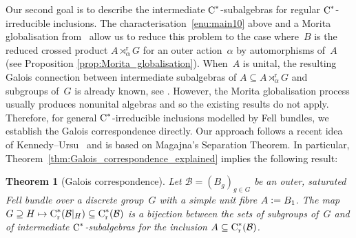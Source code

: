\documentclass[a4paper]{amsart}
\theoremstyle{plain}
\newtheorem{thmx}{Theorem}
\theoremstyle{definition}
\theoremstyle{remark}
\numberwithin{theorem}{section}
\numberwithin{equation}{section}
\newcommand*{\nb}{\nobreakdash}
\newcommand*{\red}{\mathrm{r}}%
\newcommand*{\Cst}{\textup C^*}%
\newcommand*{\B}{\mathcal B}%
\newcommand*{\defeq}{\mathrel{\vcentcolon=}}%
\begin{document}
Our second goal is to describe the intermediate
\(\Cst\)\nb-subalgebras for regular \(\Cst\)\nb-irreducible
inclusions.
The characterisation~\ref{enu:main10} above and a Morita globalisation
from~\cite{Kwasniewski-Meyer:Aperiodicity} allow us to reduce this
problem to the case where~\(B\) is the reduced crossed product
\(A\rtimes^\red_\alpha G\) for an outer action~\(\alpha\) by
automorphisms of~\(A\) (see Proposition
\ref{prop:Morita_globalisation}).
When~\(A\) is unital, the resulting Galois connection between
intermediate subalgebras of \(A\subseteq A\rtimes^\red_\alpha G\) and
subgroups of~\(G\) is already known, see
\cites{Cameron-Smith:Galois_reduced,
  Kennedy-Ursu:Intermediate_subalgebras_crossed,
  Rordam:Irreducible_inclusions}.
However, the Morita globalisation process usually produces nonunital
algebras and so the existing results do not apply.
Therefore, for general \(\Cst\)\nb-irreducible inclusions modelled by
Fell bundles, we establish the Galois correspondence directly.
Our approach follows a recent idea of
Kennedy--Ursu~\cite{Kennedy-Ursu:Intermediate_subalgebras_crossed} and
is based on Magajna's Separation Theorem.
In particular, Theorem~\ref{thm:Galois_correspondence_explained}
implies the following result:

\begin{thmx}[Galois correspondence]
  \label{Thm:Galois_correspondence}
  Let \(\B=(B_g)_{g\in G}\) be an outer, saturated Fell bundle over a
  discrete group~\(G\) with a simple unit fibre \(A\defeq B_1\).
  The map
  \(G\supseteq H \mapsto \Cst_\red(\B|_{H})\subseteq \Cst_\red(\B)\)
  is a bijection between the sets of subgroups of~\(G\)
  and of intermediate \(\Cst\)\nb-subalgebras for the inclusion
  \(A\subseteq \Cst_\red(\B)\).
\end{thmx}
\end{document}
